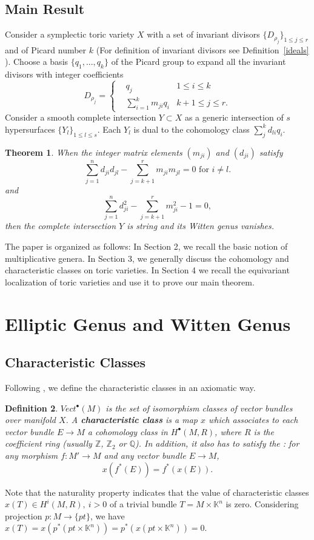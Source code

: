 \documentclass[11pt]{article}
\newtheorem{thm}{Theorem}[section]
\newtheorem{dfn}[thm]{Definition}
\newcommand{\intg}{\mathbb Z}
\newcommand{\ratl}{\mathbb Q}
\begin{document}
\subsection*{Main Result}
Consider a symplectic toric variety $X$ with a set of  invariant divisors $\{D_{\rho_j}\}_{1\leq j\leq r}$ and of Picard number $k$ (For definition of invariant divisors see Definition~\ref{ideals} ). Choose a basis $\{q_1,...,q_k\}$ of the Picard group to expand all the invariant divisors with integer coefficients
\begin{equation*}
D_{\rho_j}=\left\{
\begin{aligned}
& q_j & 1\leq i\leq k\\
& \sum_{i=1}^k m_{j i} q_i  &k+1\leq j\leq r.
\end{aligned}
\right.
\end{equation*}
Consider a smooth complete intersection $Y\subset X$ as a generic intersection of $s$ hypersurfaces $\{Y_l\}_{1\leq l\leq s}$. Each $Y_l$ is dual to the cohomology class $\sum_{j}^k d_{l i} q_i$.
\begin{thm}
When the integer matrix elements $(m_{ji})$ and $(d_{ji})$ satisfy
$$
\sum_{j=1}^n d_{ji} d_{j l}-\sum_{j=k+1}^r m_{ji}m_{j l}=0 \text{  for } i\neq l.
$$
and
$$
\sum_{j=1}^n d_{ji}^2-\sum_{j=k+1}^r m_{ji}^2-1=0,
$$
then the complete intersection $Y$ is string and its Witten genus vanishes.
\end{thm}
The paper is organized as follows: In Section 2, we recall the basic notion of multiplicative genera. In Section 3, we generally discuss the cohomology and characteristic classes on toric varieties. In Section 4 we recall the equivariant localization of toric varieties and use it to prove our main theorem.
\section{Elliptic Genus and Witten Genus}

\subsection{Characteristic Classes}
Following \cite{hirzebruch1992manifolds}, we define the characteristic classes in an axiomatic way. 
\begin{dfn}
	$Vect^\bullet(M)$ is the set of isomorphism classes of vector bundles over manifold $X$. A \textbf{characteristic class} is a map $x$ which associates to each vector bundle $E\rightarrow M$ a cohomology class in $H^\bullet(M, R)$, where $R$ is the coefficient ring (usually $\intg$, $\intg_2$ or $\ratl$). In addition, it also has to satisfy the : for any morphism $f:M'\rightarrow M$ and any vector bundle $E\rightarrow M$,
	\begin{equation*}
		x(f^*(E))=f^*(x(E)).
	\end{equation*}
\end{dfn}
	Note that the naturality property indicates that the value of characteristic classes $x(T)\in H^i(M,R),\ i>0$ of a trivial bundle $T=M\times \mathbb{K}^n$ is zero. Considering projection $p: M\rightarrow \{pt\}$, we have $x(T)=x(p^*({pt}\times \mathbb{K}^n))=p^*(x({pt}\times \mathbb{K}^n))=0$.
\end{document}
